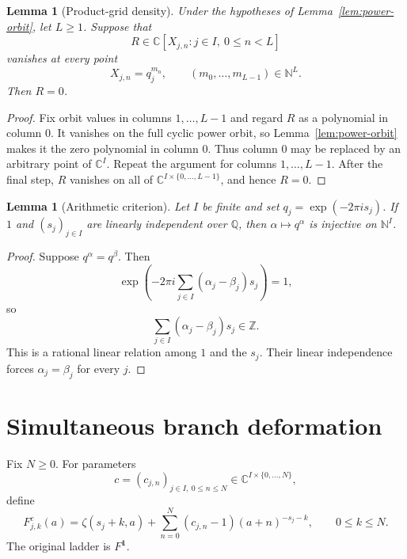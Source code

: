 \documentclass[11pt,reqno]{amsart}
\newtheorem{lemma}[theorem]{Lemma}
\theoremstyle{definition}
\theoremstyle{remark}
\newcommand{\C}{\mathbb C}
\newcommand{\Q}{\mathbb Q}
\newcommand{\N}{\mathbb N}
\newcommand{\Z}{\mathbb Z}
\begin{document}
\begin{lemma}[Product-grid density]\label{lem:product-grid}
Under the hypotheses of Lemma~\ref{lem:power-orbit}, let $L\geq1$.  Suppose
that
\[
  R\in\C[X_{j,n}:j\in I,\ 0\leq n<L]
\]
vanishes at every point
\begin{equation}\label{eq:product-grid}
  X_{j,n}=q_j^{m_n},
  \qquad (m_0,\ldots,m_{L-1})\in\N^L.
\end{equation}
Then $R=0$.
\end{lemma}

\begin{proof}
Fix orbit values in columns $1,\ldots,L-1$ and regard $R$ as a polynomial
in column $0$.  It vanishes on the full cyclic power orbit, so
Lemma~\ref{lem:power-orbit} makes it the zero polynomial in column $0$.
Thus column $0$ may be replaced by an arbitrary point of $\C^I$.  Repeat
the argument for columns $1,\ldots,L-1$.  After the final step, $R$ vanishes
on all of $\C^{I\times\{0,\ldots,L-1\}}$, and hence $R=0$.
\end{proof}

\begin{lemma}[Arithmetic criterion]\label{lem:arithmetic}
Let $I$ be finite and set $q_j=\exp(-2\pi i s_j)$.  If $1$ and
$(s_j)_{j\in I}$ are linearly independent over $\Q$, then
$\alpha\mapsto q^\alpha$ is injective on $\N^I$.
\end{lemma}

\begin{proof}
Suppose $q^\alpha=q^\beta$.  Then
\[
  \exp\left(-2\pi i\sum_{j\in I}(\alpha_j-\beta_j)s_j\right)=1,
\]
so
\[
  \sum_{j\in I}(\alpha_j-\beta_j)s_j\in\Z.
\]
This is a rational linear relation among $1$ and the $s_j$.  Their linear
independence forces $\alpha_j=\beta_j$ for every $j$.
\end{proof}

\section{Simultaneous branch deformation}\label{sec:deformation}

Fix $N\geq0$.  For parameters
\[
  c=(c_{j,n})_{j\in I,\ 0\leq n\leq N}
  \in\C^{I\times\{0,\ldots,N\}},
\]
define
\begin{equation}\label{eq:deformation}
  F_{j,k}^{c}(a)=\zeta(s_j+k,a)
  +\sum_{n=0}^{N}(c_{j,n}-1)(a+n)^{-s_j-k},
  \qquad 0\leq k\leq N.
\end{equation}
The original ladder is $F^{\mathbf 1}$.
\end{document}
